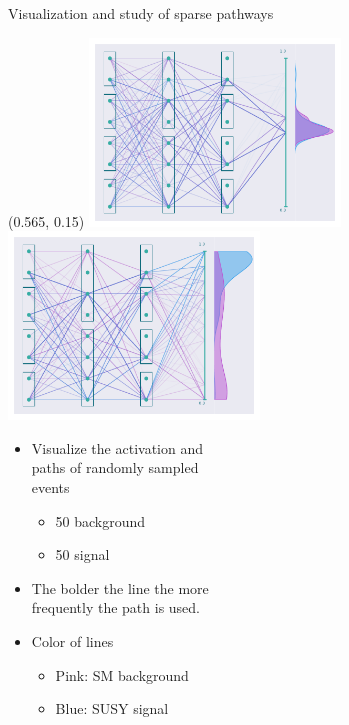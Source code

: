 \documentclass[UKenglish]{beamer}
\begin{document}
\begin{frame}{Visualization and study of sparse pathways}
    \begin{textblock}{0.8}(0.565, 0.15)
        \includegraphics[width = 0.5\textwidth]{figures/NetworkVis/BeforeTraining.pdf}
        \includegraphics[width = 0.5\textwidth]{figures/NetworkVis/AfterTraining.pdf}
    \end{textblock}
    \begin{itemize}
        \item Visualize the activation and \\
        paths of randomly sampled \\
        events
        \begin{itemize}
            \item 50 background
            \item 50 signal
        \end{itemize}
        \item The bolder the line the more\\ 
        frequently the path is used.
        \item Color of lines 
        \begin{itemize}
            \item Pink: SM background
            \item Blue: SUSY signal
        \end{itemize}
    \end{itemize}
\end{frame}
\end{document}
